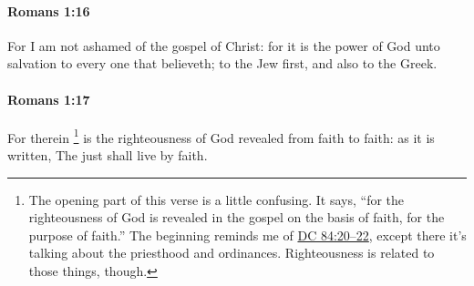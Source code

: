 		\paragraph{Romans 1:16} %
			\label{ROMANS-1-16}

			For I am not ashamed of the gospel of Christ: for it is the power of God unto salvation to every one that believeth; to the Jew first, and also to the Greek.

			\begin{framed}
			\scriptsize
				\begin{compactdesc}
					\item[SBLG] 
				\end{compactdesc}
			\end{framed}

		\paragraph{Romans 1:17} %
			\label{ROMANS-1-17}

			For therein%
				\footnote{%
					The opening part of this verse is a little confusing. It says, ``for the righteousness of God is revealed in the gospel on the basis of faith, for the purpose of faith.'' The beginning reminds me of \hyperref[DC84-20]{DC 84:20--22}, except there it's talking about the priesthood and ordinances. Righteousness is related to those things, though.
					}
			is the righteousness of God revealed from faith to faith: as it is written, The just shall live by faith.

